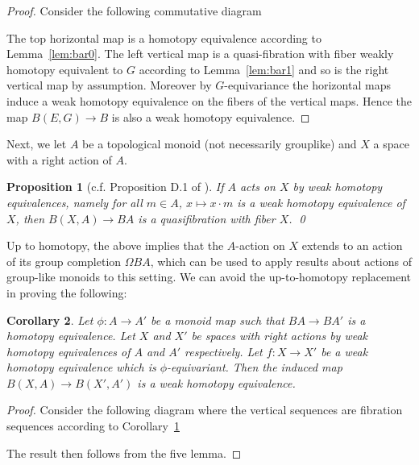 \documentclass[reqno]{amsart}
\theoremstyle{theorem}
\newtheorem{corollary}{Corollary}[section]
\newtheorem{proposition}[corollary]{Proposition}
\theoremstyle{remark}
\theoremstyle{definition}
\begin{document}
\begin{proof}
  Consider the following commutative diagram
  \begin{center}
  \end{center}
  The top horizontal map is a homotopy equivalence according to Lemma~\ref{lem:bar0}.
  The left vertical map is a quasi-fibration with fiber weakly homotopy equivalent to $G$ according to Lemma~\ref{lem:bar1}
  and so is the right vertical map by assumption. Moreover by $G$-equivariance the horizontal maps
  induce a weak homotopy equivalence on the fibers of the vertical maps. Hence the map $B(E,G)\to B$
  is also a weak homotopy equivalence.
\end{proof}


Next, we let $A$ be a topological monoid (not necessarily grouplike) and $X$ a space with a right action of $A$.
\begin{proposition}[c.f. Proposition D.1 of \cite{H11}] \label{lem:bar3}
If $A$ acts on $X$ by weak homotopy equivalences, namely for all $m\in A$, $x\mapsto x\cdot m$ is a weak homotopy equivalence of $X$,
then $B(X,A)\to BA$ is a quasifibration with fiber $X$. \qed
\end{proposition}
Up to homotopy, the above implies that the $A$-action on $X$ extends to an action of its group completion $\Omega B A$, which can be used to apply results about actions of group-like monoids to this setting. We can avoid the up-to-homotopy replacement in proving the following:
\begin{corollary}\label{lem:bar4}
Let $\phi:A\to A'$ be a monoid map such that $BA\to BA'$ is a homotopy equivalence.
Let $X$ and $X'$ be spaces with right actions by weak homotopy equivalences of $A$ and $A'$ respectively.
Let $f:X\to X'$ be a weak homotopy equivalence which is $\phi$-equivariant. Then the induced map $B(X,A)\to B(X',A')$
is a weak homotopy equivalence.
\end{corollary}
\begin{proof}
Consider the following diagram where the vertical sequences are fibration sequences according to Corollary~\ref{lem:bar3}
\begin{center}
\end{center}
The result then follows from the five lemma.
\end{proof}
\end{document}
